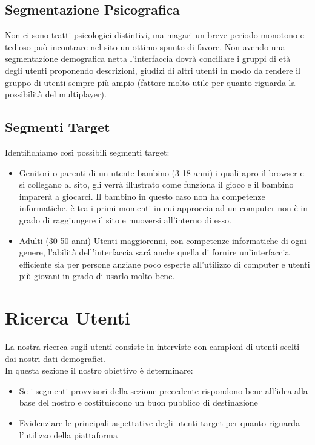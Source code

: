 \documentclass[../Report.tex]{subfiles}
\begin{document}
    
    \subsection{Segmentazione Psicografica}

    Non ci sono tratti psicologici distintivi, ma magari un breve periodo monotono e tedioso può incontrare nel sito un ottimo spunto di favore.
    Non avendo una segmentazione demografica netta l’interfaccia dovrà conciliare i gruppi di età degli utenti proponendo descrizioni, giudizi di altri utenti in modo da rendere il gruppo di utenti sempre più ampio (fattore molto utile per quanto riguarda la possibilità del multiplayer).

    \subsection{Segmenti Target}
    Identifichiamo così possibili segmenti target:
    \begin{itemize}
        \item Genitori o parenti di un utente bambino (3-18 anni) i quali apro il browser e si collegano al sito, gli verrà illustrato come funziona il gioco e il bambino imparerà a giocarci. Il bambino in questo caso non ha competenze informatiche, è tra i primi momenti in cui approccia ad un computer non è in grado di raggiungere il sito e muoversi all’interno di esso.
        \item Adulti (30-50 anni) Utenti maggiorenni, con competenze informatiche di ogni genere, l’abilità dell’interfaccia sará anche quella di fornire un’interfaccia efficiente sia per persone anziane poco esperte all’utilizzo di computer e utenti più giovani in grado di usarlo molto bene.      
    \end{itemize}

    \section{Ricerca Utenti}
    
    La nostra ricerca sugli utenti consiste in interviste con campioni di utenti scelti dai nostri dati demografici.\\
    In questa sezione il nostro obiettivo è determinare:
    \begin{itemize}
        \item Se i segmenti provvisori della sezione precedente rispondono bene all’idea alla base del nostro e costituiscono un buon pubblico di destinazione
        \item Evidenziare le principali aspettative degli utenti target per quanto riguarda l’utilizzo della piattaforma
    \end{itemize}
\end{document}

